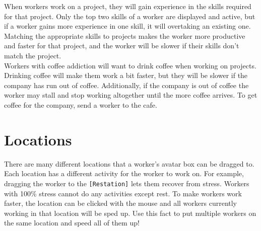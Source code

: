 \documentclass[11pt]{article}
\newcommand{\n}[0]{\\[\baselineskip]}
\begin{document}
\noindent
When workers work on a project, they will gain experience in the skills required for that project. Only the top two skills of a worker are displayed and active, but if a worker gains more experience in one skill, it will overtaking an existing one. Matching the appropriate skills to projects makes the worker more productive and faster for that project, and the worker will be slower if their skills don't match the project. 
\n
Workers with coffee addiction will want to drink coffee when working on projects. Drinking coffee will make them work a bit faster, but they will be slower if the company has run out of coffee. Additionally, if the company is out of coffee the worker may stall and stop working altogether until the more coffee arrives. To get coffee for the company, send a worker to the cafe.

\section{Locations}
There are many different locations that a worker's avatar box can be dragged to. Each location has a different activity for the worker to work on. For example, dragging the worker to the \texttt{[Restation]} lets them recover from stress. Workers with 100\% stress cannot do any activities except rest. To make workers work faster, the location can be clicked with the mouse and all workers currently working in that location will be sped up. Use this fact to put multiple workers on the same location and speed all of them up!
\end{document}
